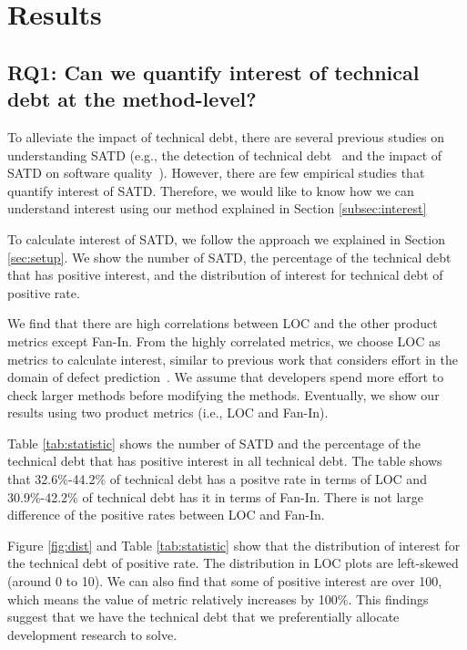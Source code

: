 \section{Results} \label{sec:results}
\subsection{RQ1: Can we quantify interest of technical debt at the method-level?}
To alleviate the impact of technical debt, there are several previous studies on understanding SATD (e.g., the detection of technical debt~\cite{Potdar2014ICSME,Zazworka2013EASE} and the impact of SATD on software quality~\cite{Wehaibi2016SANER}).
However, there are few empirical studies that quantify interest of SATD.
Therefore, we would like to know how we can understand interest using our method explained in Section \ref{subsec:interest}

To calculate interest of SATD, we follow the approach we explained in Section \ref{sec:setup}.
We show the number of SATD, the percentage of the technical debt that has positive interest, and the distribution of interest for technical debt of positive rate.

We find that there are high correlations between LOC and the other product metrics except Fan-In. 
From the highly correlated metrics, we choose LOC as metrics to calculate interest, similar to previous work that considers effort in the domain of defect prediction~\cite{Kamei2010ICSM,Kamei2013TSE}. We assume that developers spend more effort to check larger methods before modifying the methods. Eventually, we show our results using two product metrics (i.e., LOC and Fan-In).

Table \ref{tab:statistic} shows the number of SATD and the percentage of the technical debt that has positive interest in all technical debt. The table shows that 32.6\%-44.2\% of technical debt has a positve rate in terms of LOC and 30.9\%-42.2\% of technical debt has it in terms of Fan-In. 
There is not large difference of the positive rates between LOC and Fan-In. 

Figure \ref{fig:dist} and Table \ref{tab:statistic} show that the distribution of interest for the technical debt of positive rate. The distribution in LOC plots are left-skewed (around 0 to 10). We can also find that some of positive interest are over 100, which means the value of metric relatively increases by 100\%.
This findings suggest that we have the technical debt that we preferentially allocate development research to solve.

